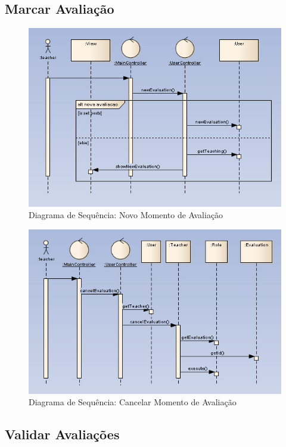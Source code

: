 \clearpage
\subsection{Marcar Avaliação}

\begin{figure}[!htbp]
\centering
\includegraphics[width=17cm]{imagens/nova_avaliacao.jpg}
\caption{Diagrama de Sequência: Novo Momento de Avaliação}
\label{fig:nova_avaliacao}
\end{figure}

\begin{figure}[!htbp]
\centering
\includegraphics[width=17cm]{imagens/cancelar_avaliacao.jpg}
\caption{Diagrama de Sequência: Cancelar Momento de Avaliação}
\label{fig:cancelar_avaliacao}
\end{figure}


\clearpage
\subsection{Validar Avaliações}

